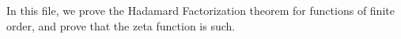 

In this file, we prove the Hadamard Factorization theorem for functions of finite order, and prove that the zeta function
is such.



